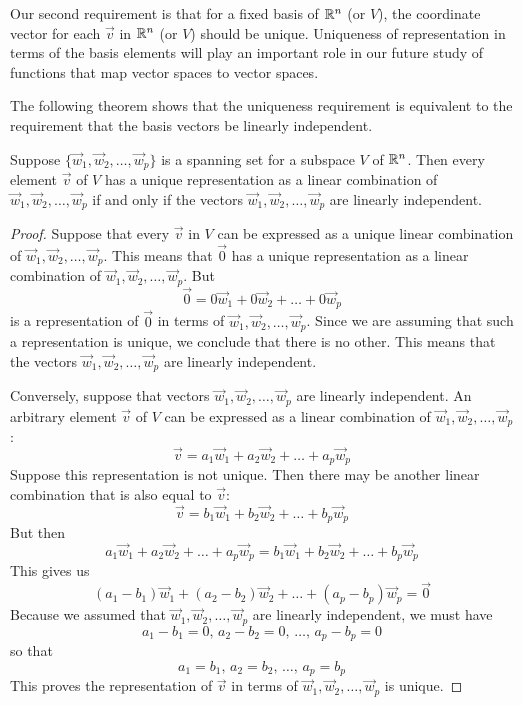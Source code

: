\documentclass{ximera}
\begin{document}
Our second requirement is that for a fixed basis of $\mathbb{R}^n$ (or $V$), the coordinate vector for each $\vec{v}$ in $\mathbb{R}^n$ (or $V$) should be unique.  Uniqueness of representation in terms of the basis elements will play an important role in our future study of functions that map vector spaces to vector spaces.

The following theorem shows that the uniqueness requirement is equivalent to the requirement that the basis vectors be linearly independent.  %

\begin{theorem}\label{th:linindbasis}
Suppose $\{\vec{w}_1, \vec{w}_2,\ldots,\vec{w}_p\}$ is a spanning set for a subspace $V$ of $\mathbb{R}^n$.  Then every element $\vec{v}$ of $V$ has a unique representation as a linear combination of  $\vec{w}_1, \vec{w}_2,\ldots,\vec{w}_p$ if and only if the vectors $\vec{w}_1, \vec{w}_2,\ldots,\vec{w}_p$ are linearly independent.
\end{theorem}
\begin{proof}
Suppose that every $\vec{v}$ in $V$ can be expressed as a unique linear combination of $\vec{w}_1, \vec{w}_2,\ldots,\vec{w}_p$.
This means that $\vec{0}$ has a unique representation as a linear combination of $\vec{w}_1, \vec{w}_2,\ldots,\vec{w}_p$.
But 
$$\vec{0}=0\vec{w}_1+0\vec{w}_2+\ldots+0\vec{w}_p$$
is a representation of $\vec{0}$ in terms of $\vec{w}_1, \vec{w}_2,\ldots,\vec{w}_p$.  Since we are assuming that such a representation is unique, we conclude that there is no other.  This means that the vectors $\vec{w}_1, \vec{w}_2,\ldots,\vec{w}_p$ are linearly independent.

Conversely, suppose that vectors $\vec{w}_1, \vec{w}_2,\ldots,\vec{w}_p$ are linearly independent.  An arbitrary element $\vec{v}$ of $V$ can be expressed as a linear combination of $\vec{w}_1, \vec{w}_2,\ldots,\vec{w}_p$:
$$\vec{v}=a_1\vec{w}_1+a_2\vec{w}_2+\ldots+a_p\vec{w}_p$$
Suppose this representation is not unique.  Then there may be another linear combination that is also equal to $\vec{v}$:
$$\vec{v}=b_1\vec{w}_1+b_2\vec{w}_2+\ldots+b_p\vec{w}_p$$
But then
$$a_1\vec{w}_1+a_2\vec{w}_2+\ldots+a_p\vec{w}_p=b_1\vec{w}_1+b_2\vec{w}_2+\ldots+b_p\vec{w}_p$$
This gives us
$$(a_1-b_1)\vec{w}_1+(a_2-b_2)\vec{w}_2+\ldots+(a_p-b_p)\vec{w}_p=\vec{0}$$
Because we assumed that $\vec{w}_1, \vec{w}_2,\ldots,\vec{w}_p$ are linearly independent, we must have
$$a_1-b_1=0,\, a_2-b_2=0,\,\ldots ,\,a_p-b_p=0$$
so that
$$a_1=b_1,\, a_2=b_2,\,\ldots ,\,a_p=b_p$$
This proves the representation of $\vec{v}$ in terms of $\vec{w}_1, \vec{w}_2,\ldots,\vec{w}_p$ is unique.

\end{proof}
\end{document}
